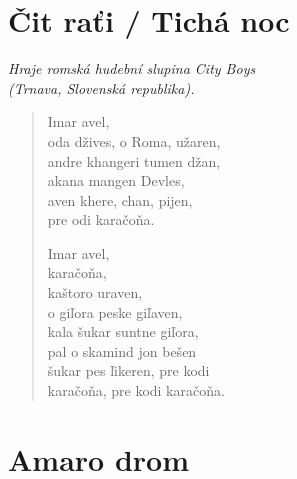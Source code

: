 
\section{Čit raťi / Tichá noc}

\noindent
\textit{Hraje romská hudební slupina City Boys \\ (Trnava, Slovenská republika).}

\begin{verse}
Imar avel, \\ 
oda džives, o Roma, užaren, \\
andre khangeri tumen džan, \\
akana mangen Devles,  \\
aven khere, chan, pijen, \\
pre odi karačoňa.

\medskip

Imar avel, \\
karačoňa, \\
kaštoro uraven, \\
o giľora peske giľaven, \\
kala šukar suntne giľora, \\
pal o skamind jon bešen \\
šukar pes ľikeren, pre kodi \\
karačoňa, pre kodi karačoňa.
\end{verse}


\bigskip

\section{Amaro drom}

